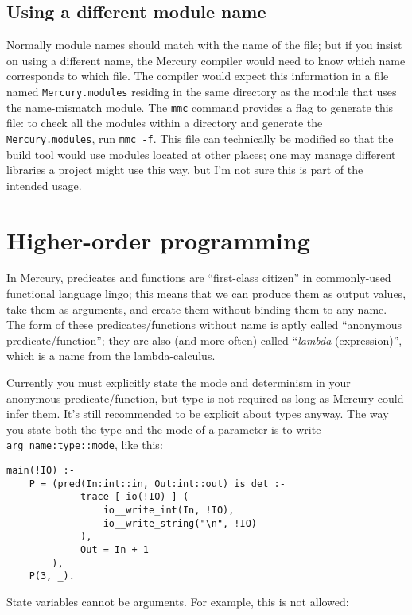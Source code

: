 \subsection{Using a different module name}

Normally module names should match with the name of the file; but if you insist on using a different name, the Mercury compiler would need to know which name corresponds to which file. The compiler would expect this information in a file named \texttt{Mercury.modules} residing in the same directory as the module that uses the name-mismatch module. The \texttt{mmc} command provides a flag to generate this file: to check all the modules within a directory and generate the \texttt{Mercury.modules}, run \texttt{mmc -f}. This file can technically be modified so that the build tool would use modules located at other places; one may manage different libraries a project might use this way, but I'm not sure this is part of the intended usage.

\section{Higher-order programming}

In Mercury, predicates and functions are ``first-class citizen'' in commonly-used functional language lingo; this means that we can produce them as output values, take them as arguments, and create them without binding them to any name. The form of these predicates/functions without name is aptly called ``anonymous predicate/function''; they are also (and more often) called ``\textit{lambda} (expression)'', which is a name from the lambda-calculus.

Currently you must explicitly state the mode and determinism in your anonymous predicate/function, but type is not required as long as Mercury could infer them. It's still recommended to be explicit about types anyway. The way you state both the type and the mode of a parameter is to write \texttt{arg_name:type::mode}, like this:

\begin{lstlisting}[language=Mercury]
main(!IO) :-
	P = (pred(In:int::in, Out:int::out) is det :-
			 trace [ io(!IO) ] (
				 io__write_int(In, !IO),
				 io__write_string("\n", !IO)
			 ),
			 Out = In + 1
		),
	P(3, _).
\end{lstlisting}

State variables cannot be arguments. For example, this is not allowed:

